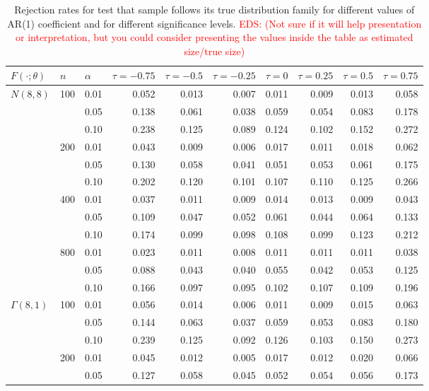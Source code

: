 \documentclass[APA,Times1COL]{WileyNJDv5} %
\newcommand{\eds}[1]{\textcolor{red}{EDS: (#1)}}
\begin{document}
\begin{table}[tbp]
\centering
\caption{Rejection rates for test that sample follows its true
                    distribution family for
                   different values of AR(1) coefficient and for different 
                   significance levels.
		\eds{Not sure if it will help presentation or interpretation, but you could
	consider presenting the values inside the table as estimated size/true size}}
\label{table:size}
\begin{tabular}{lllrrrrrrr}
  \toprule
$F(\cdot; \theta)$ & $n$ & $\alpha$ & $\tau = -0.75$ & $\tau = -0.5$ & $\tau = -0.25$ 
& $\tau = 0$ & $\tau = 0.25$ & $\tau = 0.5$ & $\tau = 0.75$ \\ 
  \midrule
{$N(8,8)$} & {100} & 0.01 & 0.052 & 0.013& 0.007 & 0.011 & 0.009 & 0.013 & 0.058 \\ 
& & 0.05 & 0.138 & 0.061 & 0.038 & 0.059 & 0.054 & 0.083 & 0.178 \\ 
& & 0.10 & 0.238 & 0.125 & 0.089 & 0.124 & 0.102 & 0.152 & 0.272 \\ 
& {200} & 0.01 & 0.043 & 0.009 & 0.006 & 0.017 & 0.011 & 0.018 & 0.062 \\ 
& & 0.05 & 0.130 & 0.058 & 0.041 & 0.051 & 0.053 & 0.061 & 0.175 \\ 
& & 0.10 & 0.202 & 0.120 & 0.101 & 0.107 & 0.110 & 0.125 & 0.266 \\ 
& {400} & 0.01 & 0.037 & 0.011 & 0.009 & 0.014 & 0.013 & 0.009 & 0.043 \\ 
& & 0.05 & 0.109 & 0.047 & 0.052 & 0.061 & 0.044 & 0.064 & 0.133 \\ 
& & 0.10 & 0.174 & 0.099 & 0.098 & 0.108 & 0.099 & 0.123 & 0.212 \\ 
& {800} & 0.01 & 0.023 & 0.011 & 0.008 & 0.011 & 0.011 & 0.011 & 0.038 \\ 
& & 0.05 & 0.088 & 0.043 & 0.040 & 0.055 & 0.042 & 0.053 & 0.125 \\ 
& & 0.10 & 0.166 & 0.097 & 0.095 & 0.102 & 0.107 & 0.109 & 0.196 \\ [1ex]
{$\Gamma(8,1)$} & {100} & 0.01 & 0.056 & 0.014 & 0.006 & 0.011 & 0.009 & 0.015 & 0.063 \\
  & & 0.05 & 0.144 & 0.063 & 0.037 & 0.059 & 0.053 & 0.083 & 0.180 \\ 
  & & 0.10 & 0.239 & 0.125 & 0.092 & 0.126 & 0.103 & 0.150 & 0.273 \\ 
  & {200} & 0.01 & 0.045 & 0.012 & 0.005 & 0.017 & 0.012 & 0.020 & 0.066 \\ 
  & & 0.05 & 0.127 & 0.058 & 0.045 & 0.052 & 0.054 & 0.056 & 0.173 \\ 

\end{tabular}
\end{table}
\end{document}
